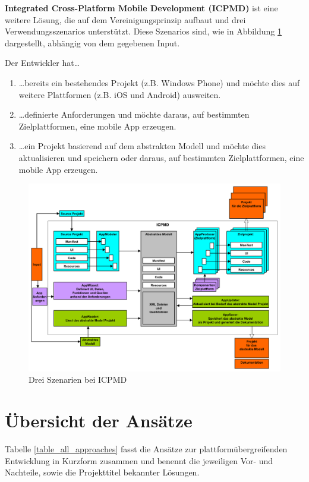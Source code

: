 \bigskip
\textbf{Integrated Cross-Platform Mobile Development (ICPMD)} ist eine weitere Lösung, die auf dem Vereinigungsprinzip aufbaut und drei Verwendungsszenarios unterstützt. Diese Szenarios sind, wie in Abbildung \ref{graph_merge_integrated_based} dargestellt, abhängig von dem gegebenen Input.

\pagebreak

\bigskip 
Der Entwickler hat…
 
\begin{enumerate}
	\item …bereits ein bestehendes Projekt (z.B. Windows Phone) und möchte dies auf weitere Plattformen (z.B. iOS und Android) ausweiten.
	
	\item …definierte Anforderungen und möchte daraus, auf bestimmten Zielplattformen, eine mobile App erzeugen.
	
	\item …ein Projekt basierend auf dem abstrakten Modell und möchte dies aktualisieren und speichern oder daraus, auf bestimmten Zielplattformen, eine mobile App erzeugen.
\end{enumerate}

\begin{figure}[htbp]
	\centering
	\includegraphics[width=1\textwidth]{Bilder/Merge_Integrated_based}
	\caption{Drei Szenarien bei ICPMD}\label{graph_merge_integrated_based}
\end{figure}

\section{Übersicht der Ansätze}
Tabelle \ref{table_all_approaches} fasst die Ansätze zur plattformübergreifenden Entwicklung in Kurzform zusammen und benennt die jeweiligen Vor- und Nachteile, sowie die Projekttitel bekannter Lösungen.

